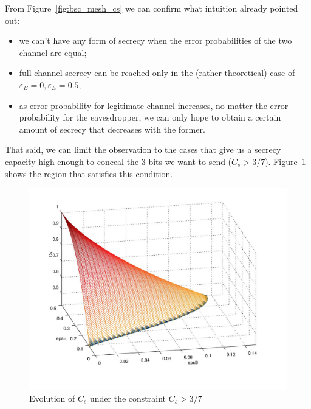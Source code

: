 \documentclass[a4paper,12pt,titlepage]{article}
\begin{document}
From Figure~\ref{fig:bsc_mesh_cs} we can confirm what intuition already pointed
out:
\begin{itemize}
  \item we can't have any form of secrecy when the error probabilities of the
  two channel are equal;
  \item full channel secrecy can be reached only in the (rather theoretical)
  case of $\varepsilon_B = 0, \varepsilon_E = 0.5$;
  \item as error probability for legitimate channel increases, no matter the
  error probability for the eavesdropper, we can only hope to obtain a certain
  amount of secrecy that decreases with the former.
\end{itemize}

That said, we can limit the observation to the cases that give us a secrecy
capacity high enough to conceal the 3 bits we want to send ($C_s > 3/7$).
Figure~\ref{fig:bsc_mesh_cs_3bit} shows the region that satisfies this condition.

\begin{figure}[p]
  \centering
  \includegraphics[scale=0.8]{bsc_mesh_cs_3bit.jpg}
  \caption{Evolution of $C_s$ under the constraint $C_s > 3/7$}
  \label{fig:bsc_mesh_cs_3bit}
\end{figure}
\end{document}
